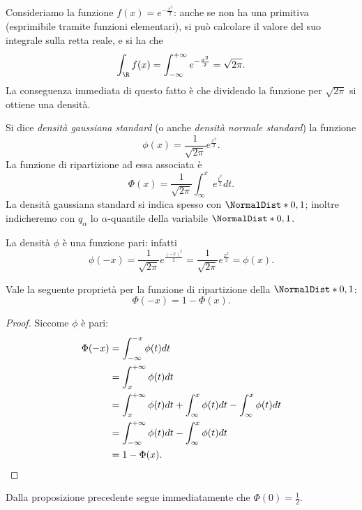 Consideriamo la funzione $f(x) = e^{-\frac{x^2}{2}}$: anche se non ha una primitiva (esprimibile tramite funzioni elementari), si può calcolare il valore del suo integrale sulla retta reale, e si ha che \[
    \int_\R f(x) = \int_{-\infty}^{+\infty} e^{-\frac{x^2}{2}} = \sqrt{2\pi}.    
\] La conseguenza immediata di questo fatto è che dividendo la funzione per $\sqrt{2\pi}$ si ottiene una densità.

\begin{definition}
     Si dice \emph{densità gaussiana standard} (o anche \emph{densità normale standard}) la funzione \[
        \phi(x) = \frac{1}{\sqrt{2\pi}}e^{\frac{x^2}{2}}.    
    \] La funzione di ripartizione ad essa associata è \[
        \Phi(x) = \frac{1}{\sqrt{2\pi}}\int_{\infty}^x e^{\frac{t^2}{2}}dt.
    \] La densità gaussiana standard si indica spesso con $\NormalDist*{0, 1}$; inoltre indicheremo con $q_\alpha$ lo $\alpha$-quantile della variabile $\NormalDist*{0, 1}$.
\end{definition}

\begin{remark}
    La densità $\phi$ è una funzione pari: infatti \[
        \phi(-x) = \frac{1}{\sqrt{2\pi}}e^{\frac{(-x)^2}{2}} =  \frac{1}{\sqrt{2\pi}}e^{\frac{x^2}{2}} = \phi(x).
    \]
\end{remark}

\begin{proposition}
    Vale la seguente proprietà per la funzione di ripartizione della $\NormalDist*{0, 1}$: \[
        \Phi(-x) = 1 - \Phi(x).    
    \]
\end{proposition}
\begin{proof} Siccome $\phi$ è pari:
    \begin{align*}
        \Phi(-x) &= \int_{-\infty}^{-x} \phi(t)dt \\
        &= \int_x^{+\infty} \phi(t)dt \\
        &= \int_x^{+\infty} \phi(t)dt + \int_{\infty}^{x} \phi(t)dt - \int_{\infty}^{x} \phi(t)dt\\
        &= \int_{-\infty}^{+\infty} \phi(t)dt - \int_{\infty}^{x} \phi(t)dt\\
        &= 1 - \Phi(x). \qedhere
    \end{align*}
\end{proof}
\begin{remark}
    Dalla proposizione precedente segue immediatamente che $\Phi(0) = \frac{1}{2}$.
\end{remark}

